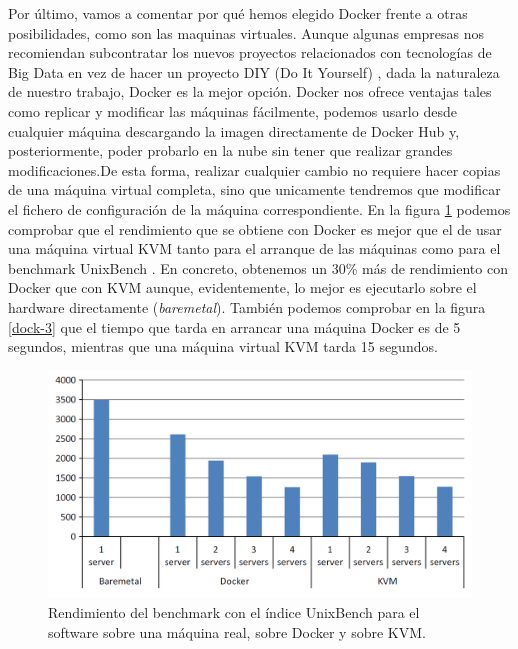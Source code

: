 Por último, vamos a comentar por qué hemos elegido Docker frente a otras
posibilidades, como son las maquinas virtuales. Aunque algunas empresas
nos recomiendan subcontratar los nuevos proyectos relacionados con
tecnologías de Big Data en vez de hacer un proyecto DIY (Do It Yourself)
\cite{Dck-14}, dada la naturaleza de nuestro trabajo, Docker es la mejor
opción. Docker nos ofrece ventajas tales como replicar y modificar las
máquinas fácilmente, podemos usarlo desde cualquier máquina descargando
la imagen directamente de Docker Hub y, posteriormente, poder probarlo en
la nube sin tener que realizar grandes modificaciones.De esta forma,
realizar cualquier cambio no requiere hacer copias de una máquina virtual
completa, sino que unicamente tendremos que modificar el fichero de
configuración de la máquina correspondiente. En la figura
\ref{dock-2} \cite{Dck-15} podemos comprobar que el rendimiento que se
obtiene con Docker es mejor que el de usar una máquina virtual KVM tanto
para el arranque de las máquinas como para el benchmark UnixBench
\cite{Dck-15}. En concreto, obtenemos un 30\% más de rendimiento con
Docker que con KVM aunque, evidentemente, lo mejor es ejecutarlo sobre
el hardware directamente (\emph{baremetal}). También podemos comprobar en
la figura \ref{dock-3} \cite{Dck-15} que el tiempo que tarda en arrancar
una máquina Docker es de 5 segundos, mientras que una máquina virtual KVM
tarda 15 segundos.

\begin{figure}[htp]
\centering
\includegraphics[scale=0.30]{Imagenes/dockervsvm2.png}
\caption{Rendimiento del benchmark con el índice UnixBench para el software
  sobre una máquina real, sobre Docker y sobre KVM.}
\label{dock-2}
\end{figure}

